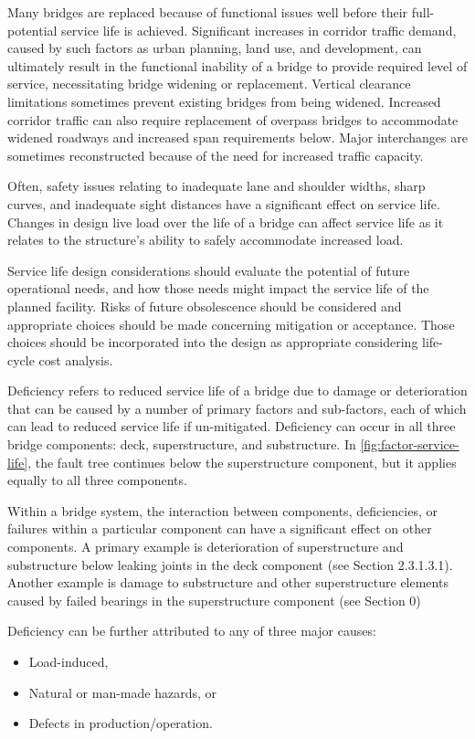 Many bridges are replaced because of functional issues well before their full-potential service life is achieved. Significant increases in corridor traffic demand, caused by such factors as urban planning, land use, and development, can ultimately result in the functional inability of a bridge to provide required level of service, necessitating bridge widening or replacement. Vertical clearance limitations sometimes prevent existing bridges from being widened. Increased corridor traffic can also require replacement of overpass bridges to accommodate widened roadways and increased span requirements below. Major interchanges are sometimes reconstructed because of the need for increased traffic capacity.

Often, safety issues relating to inadequate lane and shoulder widths, sharp curves, and inadequate sight distances have a significant effect on service life. Changes in design live load over the life of a bridge can affect service life as it relates to the structure’s ability to safely accommodate increased load.

Service life design considerations should evaluate the potential of future operational needs, and how those needs might impact the service life of the planned facility. Risks of future obsolescence should be considered and appropriate choices should be made concerning mitigation or acceptance. Those choices should be incorporated into the design as appropriate considering life-cycle cost analysis.

Deficiency refers to reduced service life of a bridge due to damage or deterioration that can be caused by a number of primary factors and sub-factors, each of which can lead to reduced service life if un-mitigated. Deficiency can occur in all three bridge components: deck, superstructure, and substructure. In \cref{fig:factor-service-life}, the fault tree continues below the superstructure component, but it applies equally to all three components.

Within a bridge system, the interaction between components, deficiencies, or failures within a particular component can have a significant effect on other components. A primary example is deterioration of superstructure and substructure below leaking joints in the deck component (see Section 2.3.1.3.1). Another example is damage to substructure and other superstructure elements caused by failed bearings in the superstructure component (see Section 0)

Deficiency can be further attributed to any of three major causes:
\begin{itemize}
  \item Load-induced,
  \item Natural or man-made hazards, or
  \item Defects in production/operation.
\end{itemize}

